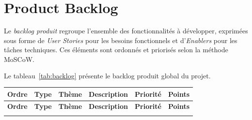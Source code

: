 \section{Product Backlog}
Le \textit{backlog produit} regroupe l'ensemble des fonctionnalités à développer, exprimées sous forme de \textit{User Stories} pour les besoins fonctionnels et d'\textit{Enablers} pour les tâches techniques. Ces éléments sont ordonnés et priorisés selon la méthode MoSCoW.

Le tableau~\ref{tab:backlog} présente le backlog produit global du projet.

\renewcommand{\arraystretch}{1.2}
\begin{longtable}{|c|p{2cm}|p{2.2cm}|p{6.8cm}|c|c|}
    \hline
    \textbf{Ordre} & \textbf{Type} & \textbf{Thème} & \textbf{Description} & \textbf{Priorité} & \textbf{Points} \\
    \hline
    \endfirsthead
    \hline
    \textbf{Ordre} & \textbf{Type} & \textbf{Thème} & \textbf{Description} & \textbf{Priorité} & \textbf{Points} \\
    \hline
    \endhead
    \hline
    \endfoot
    

\end{longtable}

